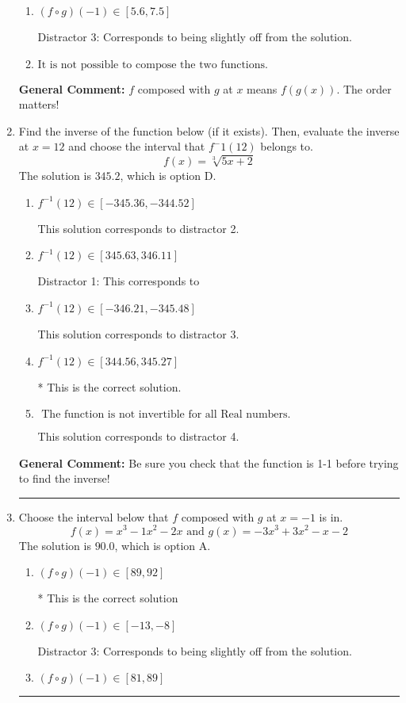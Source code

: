 \documentclass{extbook}[14pt]
\newcommand{\litem}[1]{\item #1

\rule{\textwidth}{0.4pt}}
\begin{document}
\begin{enumerate}
{\begin{enumerate}[label=\Alph*.]
 Distractor 1: Corresponds to reversing the composition.
\item \( (f \circ g)(-1) \in [5.6, 7.5] \)

 Distractor 3: Corresponds to being slightly off from the solution.
\item \( \text{It is not possible to compose the two functions.} \)


\end{enumerate}

\textbf{General Comment:} $f$ composed with $g$ at $x$ means $f(g(x))$. The order matters!
}
\litem{
Find the inverse of the function below (if it exists). Then, evaluate the inverse at $x = 12$ and choose the interval that $f^-1(12)$ belongs to.
\[ f(x) = \sqrt[3]{5 x + 2} \]The solution is \( 345.2 \), which is option D.\begin{enumerate}[label=\Alph*.]
\item \( f^{-1}(12) \in [-345.36, -344.52] \)

 This solution corresponds to distractor 2.
\item \( f^{-1}(12) \in [345.63, 346.11] \)

 Distractor 1: This corresponds to 
\item \( f^{-1}(12) \in [-346.21, -345.48] \)

 This solution corresponds to distractor 3.
\item \( f^{-1}(12) \in [344.56, 345.27] \)

* This is the correct solution.
\item \( \text{ The function is not invertible for all Real numbers. } \)

 This solution corresponds to distractor 4.
\end{enumerate}

\textbf{General Comment:} Be sure you check that the function is 1-1 before trying to find the inverse!
}
\litem{
Choose the interval below that $f$ composed with $g$ at $x=-1$ is in.
\[ f(x) = x^{3} -1 x^{2} -2 x \text{ and } g(x) = -3x^{3} +3 x^{2} -x -2 \]The solution is \( 90.0 \), which is option A.\begin{enumerate}[label=\Alph*.]
\item \( (f \circ g)(-1) \in [89, 92] \)

* This is the correct solution
\item \( (f \circ g)(-1) \in [-13, -8] \)

 Distractor 3: Corresponds to being slightly off from the solution.
\item \( (f \circ g)(-1) \in [81, 89] \)


\end{enumerate}}
\end{enumerate}
\end{document}
